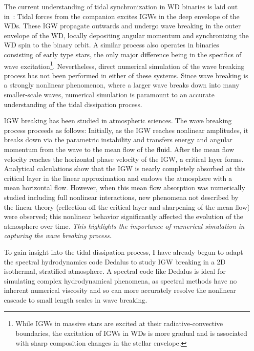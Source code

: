 \documentclass[12pt,
        usenames, %
        dvipsnames %
    ]{article}
\begin{document}
The current understanding of tidal synchronization in WD binaries is laid out
in~\cite{fullerII}: Tidal forces from the companion excites IGWs in the deep
envelope of the WDs. These IGW propagate outwards and undergo wave breaking in
the outer envelope of the WD, locally depositing angular momentum and
synchronizing the WD spin to the binary orbit. A similar process also operates
in binaries consisting of early type stars\cite{zahn75,gn89}, the only major
difference being in the specifics of wave excitation\footnote{While IGWs in
massive stars are excited at their radiative-convective boundaries, the
excitation of IGWs in WDs is more gradual and is associated with sharp
composition changes in the stellar envelope\cite{fullerII}.}. Nevertheless,
direct numerical simulation of the wave breaking process has not been performed
in either of these systems. Since wave breaking is a strongly nonlinear
phenomenon, where a larger wave breaks down into many smaller-scale waves,
numerical simulation is paramount to an accurate understanding of the tidal
dissipation process.

IGW breaking has been studied in atmospheric sciences. The wave breaking process
proceeds as follows: Initially, as the IGW reaches nonlinear amplitudes, it
breaks down via the parametric instability and transfers energy and angular
momentum from the wave to the mean flow of the fluid\cite{drazin}. After the
mean flow velocity reaches the horizontal phase velocity of the IGW, a critical
layer forms. Analytical calculations show that the IGW is nearly completely
absorbed at this critical layer in the linear approximation and endows the
atmosphere with a mean horizontal flow\cite{booker_bretherton,hazel}. However,
when this mean flow absorption was numerically studied including full nonlinear
interactions, new phenomena not described by the linear theory (reflection off
the critical layer and sharpening of the mean flow) were
observed\cite{jones_num,winters1994}; this nonlinear behavior significantly
affected the evolution of the atmosphere over time. \emph{This highlights the
importance of numerical simulation in capturing the wave breaking process.}

To gain insight into the tidal dissipation process, I have already begun to
adapt the spectral hydrodynamics code Dedalus\cite{dedalus} to study IGW
breaking in a 2D isothermal, stratified atmosphere. A spectral code like Dedalus
is ideal for simulating complex hydrodynamical phenomena, as spectral methods
have no inherent numerical viscosity and so can more accurately resolve the
nonlinear cascade to small length scales in wave breaking.
\end{document}
